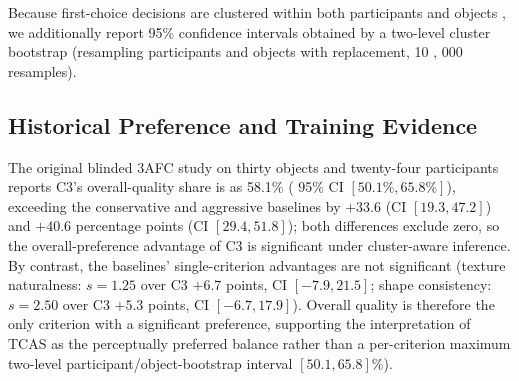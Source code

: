 \documentclass[times,twocolumn,final]{elsarticle}
\providecommand{\DIFadd}[1]{{\protect\color{blue} \sf #1}} %
\providecommand{\DIFdel}[1]{{\protect\color{red} \scriptsize #1}} %
\providecommand{\DIFaddbegin}{} %
\providecommand{\DIFaddend}{} %
\providecommand{\DIFdelbegin}{} %
\providecommand{\DIFdelend}{} %
\begin{document}
\DIFdelbegin \DIFdel{Because first-choice decisions are clustered within both participants and objects , we additionally report 95\% confidence intervals obtained by a two-level cluster bootstrap (resampling participants and objects with replacement, 10}%
\DIFdel{,}%
\DIFdel{000 resamples). }\DIFdelend \DIFaddbegin \subsection{Historical Preference and Training Evidence}
\label{subsec:preference}
\DIFadd{The original blinded 3AFC study on thirty objects and twenty-four participants reports }\DIFaddend C3's overall-quality share \DIFdelbegin \DIFdel{is }\DIFdelend \DIFaddbegin \DIFadd{as }\DIFaddend 58.1\% (\DIFdelbegin \DIFdel{95\% CI $[50.1\%, 65.8\%]$), exceeding the conservative and aggressive baselines by $+33.6$ (CI $[19.3, 47.2]$) and $+40.6$ percentage points (CI $[29.4, 51.8]$); both differences exclude zero, so the overall-preference advantage of C3 is significant under cluster-aware inference. By contrast, the baselines' single-criterion advantages are not significant (texture naturalness: $s = 1.25$ over C3 $+6.7$ points, CI $[-7.9, 21.5]$; shape consistency: $s = 2.50$ over C3 $+5.3$ points, CI $[-6.7, 17.9]$). Overall quality is therefore the only criterion with a significant preference, supporting the interpretation of TCAS as the perceptually preferred balance rather than a per-criterion maximum}\DIFdelend \DIFaddbegin \DIFadd{two-level participant/object-bootstrap interval $[50.1,65.8]\%$)}\DIFaddend . \DIFdelbegin %

\end{document}

